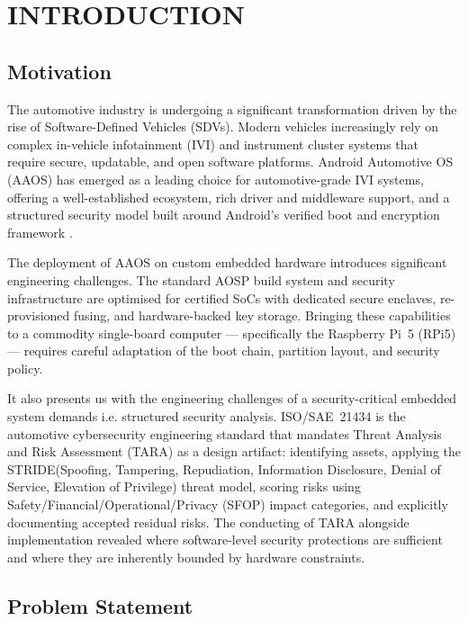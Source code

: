 \chapter{INTRODUCTION}
\label{ch:introduction}

\section{Motivation}

The automotive industry is undergoing a significant transformation driven by the rise of Software-Defined Vehicles (SDVs). Modern vehicles increasingly rely on complex in-vehicle infotainment (IVI) and instrument cluster systems that require secure, updatable, and open software platforms. Android Automotive OS (AAOS) has emerged as a leading choice for automotive-grade IVI systems, offering a well-established ecosystem, rich driver and middleware support, and a structured security model built around Android's verified boot and encryption framework \cite{aaos_overview}.

The deployment of AAOS on custom embedded hardware introduces significant engineering challenges. The standard AOSP build system and security infrastructure are optimised for certified SoCs with dedicated secure enclaves, re-provisioned fusing, and hardware-backed key storage. Bringing these capabilities to a commodity single-board computer --- specifically the Raspberry Pi~5 (RPi5) --- requires careful adaptation of the boot chain, partition layout, and security policy.

It also presents us with the engineering challenges of a security-critical embedded system demands i.e. structured security analysis. ISO/SAE~21434 \cite{iso_sae_21434} is the automotive cybersecurity engineering standard that mandates Threat Analysis and Risk Assessment (TARA) as a design artifact: identifying assets, applying the STRIDE(Spoofing, Tampering, Repudiation, Information Disclosure, Denial of Service, Elevation of Privilege) threat model, scoring risks using Safety/Financial/Operational/Privacy (SFOP) impact categories, and explicitly documenting accepted residual risks. The conducting of TARA alongside implementation revealed where software-level security protections are sufficient and where they are inherently bounded by hardware constraints.

\section{Problem Statement}

